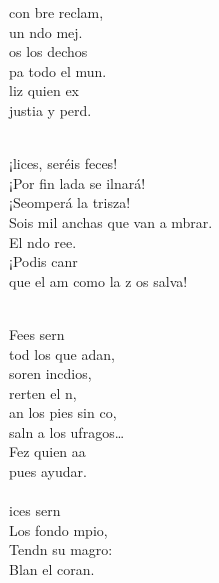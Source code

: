 \begin{cancion}
	con bre reclam,\\
	un ndo mej.\\
	os los dechos\\
	pa todo el mun.\\
	liz quien ex\\
	justia y perd. \\\jump\\
	\begin{chorus}%
	¡lices, seréis feces! \\
	¡Por fin lada se ilnará!\\
	¡Seomperá la trisza!\\
	Sois mil anchas que van a mbrar.\\
	El ndo ree.\\
	¡Podis canr\\
	que el am como la z os salva!\\
	\end{chorus}%
	\jump\\
	Fees sern\\
	tod los que adan,\\
	soren incdios,\\
	rerten el n,\\
	an los pies sin co,\\
	saln a los ufragos… \\
	Fez quien aa\\
	pues  ayudar.\\
\jump\\
	ices sern\\
	Los  fondo mpio,\\
	Tendn su magro:\\
	Blan el coran. \\

\end{cancion}
